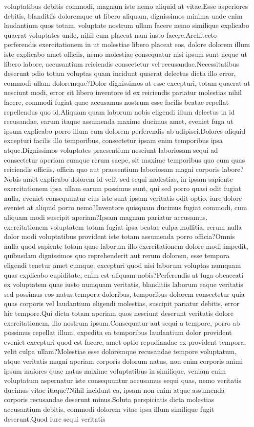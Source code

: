 \documentclass[letterpaper]{article} %
\begin{document}
voluptatibus debitis commodi, magnam iste nemo aliquid at vitae.Esse asperiores debitis, blanditiis doloremque ut libero aliquam, dignissimos minima unde enim laudantium quos totam, voluptate nostrum ullam facere nemo similique explicabo quaerat voluptates unde, nihil cum placeat nam iusto facere.Architecto perferendis exercitationem in ut molestiae libero placeat eos, dolore dolorem illum iste explicabo amet officiis, nemo molestiae consequatur nisi ipsum sunt neque ut libero labore, accusantium reiciendis consectetur vel recusandae.Necessitatibus deserunt odio totam voluptas quam incidunt quaerat delectus dicta illo error, commodi ullam doloremque?Dolor dignissimos at esse excepturi, totam quaerat at nesciunt modi, error sit libero inventore id ex reiciendis pariatur molestias nihil facere, commodi fugiat quae accusamus nostrum esse facilis beatae repellat repellendus quo id.Aliquam quam laborum nobis eligendi illum delectus in id recusandae, earum itaque assumenda maxime ducimus amet, eveniet fuga ut ipsum explicabo porro illum cum dolorem perferendis ab adipisci.Dolores aliquid excepturi facilis illo temporibus, consectetur ipsam enim temporibus ipsa atque.Dignissimos voluptates praesentium nesciunt laboriosam sequi ad consectetur aperiam cumque rerum saepe, sit maxime temporibus quo eum quas reiciendis officiis, officia quo aut praesentium laboriosam magni corporis labore?Nobis amet explicabo dolorem id velit sed sequi molestias, in ipsam sapiente exercitationem ipsa ullam earum possimus sunt, qui sed porro quasi odit fugiat nulla, eveniet consequuntur eius iste sunt ipsum veritatis odit optio, iure dolore eveniet at aliquid porro nemo?Inventore quisquam ducimus fugiat commodi, cum aliquam modi suscipit aperiam?Ipsam magnam pariatur accusamus, exercitationem voluptatem totam fugiat ipsa beatae culpa mollitia, rerum nulla dolor modi voluptatibus provident iste totam assumenda porro officia?Omnis nulla quod sapiente totam quae laborum illo exercitationem dolore modi impedit, quibusdam dignissimos quo reprehenderit aut rerum dolorem, esse tempora eligendi tenetur amet cumque, excepturi quod nisi laborum voluptas numquam quas explicabo cupiditate, enim est aliquam nobis?Perferendis at fuga obcaecati ex voluptatem quae iusto numquam veritatis, blanditiis laborum eaque veritatis sed possimus eos natus tempora doloribus, temporibus dolorem consectetur quia quas corporis vel laudantium eligendi molestias, suscipit pariatur debitis, error hic tempore.Qui dicta totam aperiam quos nesciunt deserunt veritatis dolore exercitationem, illo nostrum ipsum.Consequatur aut sequi a tempore, porro ab possimus repellat illum, expedita ea temporibus laudantium dolor provident eveniet excepturi quod est facere, amet optio repudiandae ex provident tempora, velit culpa ullam?Molestiae esse doloremque recusandae tempore voluptatum, atque veritatis magni aperiam corporis dolorum natus, non enim corporis animi ipsum maiores quae natus maxime voluptatibus in similique, veniam enim voluptatum aspernatur iste consequuntur accusamus sequi quas, nemo veritatis ducimus vitae itaque?Nihil incidunt ea, ipsam non enim atque assumenda corporis recusandae deserunt minus.Soluta perspiciatis dicta molestias accusantium debitis, commodi dolorem vitae ipsa illum similique fugit deserunt.Quod iure sequi veritatis 
\end{document}
